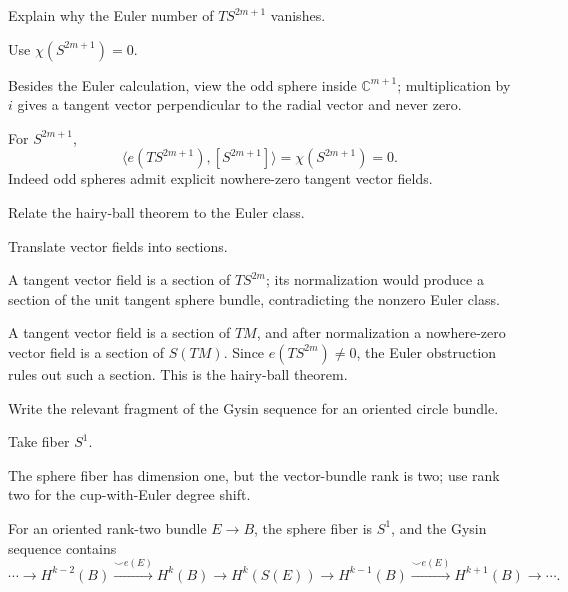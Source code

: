 \begin{exercise}\label{exr:viii32-09}
Explain why the Euler number of $TS^{2m+1}$ vanishes.
\end{exercise}
\begin{hint}
Use $\chi(S^{2m+1})=0$.

Besides the Euler calculation, view the odd sphere inside \(\mathbb C^{m+1}\); multiplication by \(i\) gives a tangent vector perpendicular to the radial vector and never zero.
\end{hint}
\begin{solution}
For \(S^{2m+1}\),
\[
\langle e(TS^{2m+1}),[S^{2m+1}]\rangle=\chi(S^{2m+1})=0.
\]
Indeed odd spheres admit explicit nowhere-zero tangent vector fields.
\end{solution}

\begin{exercise}\label{exr:viii32-10}
Relate the hairy-ball theorem to the Euler class.
\end{exercise}
\begin{hint}
Translate vector fields into sections.

A tangent vector field is a section of \(TS^{2m}\); its normalization would produce a section of the unit tangent sphere bundle, contradicting the nonzero Euler class.
\end{hint}
\begin{solution}
A tangent vector field is a section of \(TM\), and after normalization a nowhere-zero vector field is a section of \(S(TM)\). Since \(e(TS^{2m})\ne0\), the Euler obstruction rules out such a section. This is the hairy-ball theorem.
\end{solution}

\begin{exercise}\label{exr:viii32-11}
Write the relevant fragment of the Gysin sequence for an oriented circle bundle.
\end{exercise}
\begin{hint}
Take fiber $S^1$.

The sphere fiber has dimension one, but the vector-bundle rank is two; use rank two for the cup-with-Euler degree shift.
\end{hint}
\begin{solution}
For an oriented rank-two bundle \(E\to B\), the sphere fiber is \(S^1\), and the Gysin sequence contains
\[
\cdots\to H^{k-2}(B)\xrightarrow{\smile e(E)}H^k(B)
\to H^k(S(E))\to H^{k-1}(B)\xrightarrow{\smile e(E)}H^{k+1}(B)\to\cdots.
\]
\end{solution}

